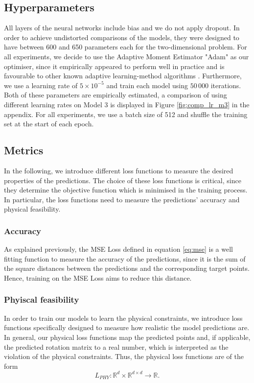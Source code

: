 \subsection{Hyperparameters}
All layers of the neural networks include bias and we do not apply dropout. In order to achieve undistorted comparisons of the models, they were designed to have between 600 and 650 parameters each for the two-dimensional problem. For all experiments, we decide to use the Adaptive Moment Estimator "Adam" as our optimiser, since it empirically appeared to perform well in practice and is favourable to other known adaptive learning-method algorithms \cite{DBLP:journals/corr/Ruder16}. Furthermore, we use a learning rate of $5\times 10^{-5}$ and train each model using $50\,000$ iterations. Both of these parameters are empirically estimated, a comparison of using different learning rates on Model 3 is displayed in Figure \ref{fig:comp_lr_m3} in the appendix. For all experiments, we use a batch size of 512 and shuffle the training set at the start of each epoch.

\subsection{Metrics}
In the following, we introduce different loss functions to measure the desired properties of the predictions. The choice of these loss functions is critical, since they determine the objective function which is minimised in the training process. In particular, the loss functions need to measure the predictions' accuracy and physical feasibility.
\subsubsection{Accuracy}
As explained previously, the MSE Loss defined in equation \eqref{eq:mse} is a well fitting function to measure the accuracy of the predictions, since it is the sum of the square distances between the predictions and the corresponding target points. Hence, training on the MSE Loss aims to reduce this distance.
\subsubsection{Phyiscal feasibility}
In order to train our models to learn the physical constraints, we introduce loss functions specifically designed to measure how realistic the model predictions are. In general, our physical loss functions map the predicted points and, if applicable, the predicted rotation matrix to a real number, which is interpreted as the violation of the physical constraints. Thus, the physical loss functions are of the form
\[L_{PHY}: \mathbb{R}^d \times \mathbb{R}^{d \times d} \to \mathbb{R}. \]
